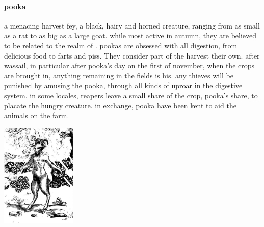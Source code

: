 \paragraph{pooka} a menacing harvest fey, a black, hairy and horned creature, ranging from as small as a rat to as big as a large goat. while most active in autumn, they are believed to be related to the realm of . pookas are obsessed with all digestion, from delicious food to farts and piss. They consider part of the harvest their own. after wassail, in particular after pooka's day on the first of november, when the crops are brought in, anything remaining in the fields is his. any thieves will be punished by amusing the pooka, through all kinds of uproar in the digestive system. in some locales, reapers leave a small share of the crop, pooka's share, to placate the hungry creature. in exchange, pooka have been kent to aid the animals on the farm. \begin{center}\includegraphics[width=3.6cm]{encyclopedia/pooka.png}\end{center}
